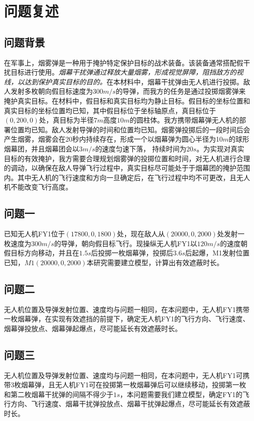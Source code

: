 \documentclass{article}
\begin{document}
\section{问题复述}

\subsection{问题背景}

在军事上，烟雾弹是一种用于掩护特定保护目标的战术装备。该装备通常搭配假干扰目标进行使用。\textit{烟幕干扰弹通过释放大量烟雾，形成视觉屏障，阻挡敌方的视线，以达到保护真实目标的目的。}在本材料中，烟幕干扰弹由无人机进行投掷。敌人发射多枚朝向假目标速度为$300m/s$的导弹，而我方的任务是通过投掷烟雾弹来掩护真实目标。在材料中，假目标和真实目标均为静止目标。假目标的坐标位置和真实目标的坐标位置均已知，其中假目标位于坐标轴原点，真目标位于$(0,200,0)$处，真目标为半径$7m$高度$10m$的圆柱体。我方携带烟幕弹无人机的部署位置均已知。敌人发射导弹的时间和位置均已知。烟雾弹投掷后的一段时间后会产生烟雾，烟雾会在20秒内持续存在，形成一个以烟幕弹为圆心半径为10$m$的球形烟幕团，并且烟幕团会以$3 m/s$的速度匀速下落，
持续时间为20$s$。为实现对真实目标的有效掩护，我方需要合理规划烟雾弹的投掷位置和时间，对无人机进行合理的调动，以确保在敌人导弹飞行过程中，真实目标尽可能处于于烟幕团的掩护范围内。其中无人机的飞行速度和方向一旦确定后，在飞行过程中均不可更改，且无人机不能改变飞行高度。


\subsection{问题一}

已知无人机FY1位于$(17800,0,1800)$处，现在敌人从$(20000,0,2000)$处发射一枚速度为$300m/s$的导弹，朝向假目标飞行。现操纵无人机FY1以$120m/s$的速度朝假目标方向移动，并且在$1.5s$后投掷一枚烟幕弹，投掷后$3.6s$后起爆，M1发射位置已知，$M1(20000,0,2000)$本研究需要建立模型，计算出有效遮蔽时长。
\subsection{问题二}

无人机位置及导弹发射位置、速度均与问题一相同，在本问题中，无人机FY1携带一枚烟幕弹，在实现有效遮挡的前提下，确定无人机FY1的飞行方向、飞行速度、烟幕弹投放点、烟幕弹起爆点，尽可能延长有效遮蔽时长。
\subsection{问题三}

无人机位置及导弹发射位置、速度均与问题一相同，在本问题中，无人机FY1可携带3枚烟幕弹，且无人机FY1可在投掷第一枚烟幕弹后可以继续移动，投掷第一枚和第二枚烟幕干扰弹的间隔不得少于$1s$，本问题需要我们建立模型，确定FY1的飞行方向、飞行速度、烟幕干扰弹投放点、烟幕干扰弹起爆点，尽可能延长有效遮蔽时长。
\end{document}
